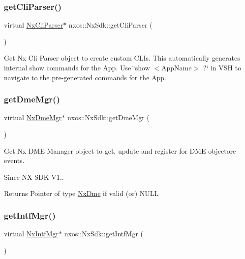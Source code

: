 \subsubsection{\texorpdfstring{get\+Cli\+Parser()}{getCliParser()}}
{\footnotesize\ttfamily virtual \mbox{\hyperlink{classnxos_1_1_nx_cli_parser}{Nx\+Cli\+Parser}}$\ast$ nxos\+::\+Nx\+Sdk\+::get\+Cli\+Parser (\begin{DoxyParamCaption}{ }\end{DoxyParamCaption})\hspace{0.3cm}{\ttfamily [pure virtual]}}

Get Nx Cli Parser object to create custom C\+L\+Is. This automatically generates internal show commands for the App. Use \char`\"{}show $<$\+App\+Name$>$ ?\char`\"{} in V\+SH to navigate to the pre-\/generated commands for the App. \mbox{\label{classnxos_1_1_nx_sdk_a089933980bfe0466870510bb94158763}} 
\subsubsection{\texorpdfstring{get\+Dme\+Mgr()}{getDmeMgr()}}
{\footnotesize\ttfamily virtual \mbox{\hyperlink{classnxos_1_1_nx_dme_mgr}{Nx\+Dme\+Mgr}}$\ast$ nxos\+::\+Nx\+Sdk\+::get\+Dme\+Mgr (\begin{DoxyParamCaption}{ }\end{DoxyParamCaption})\hspace{0.3cm}{\ttfamily [pure virtual]}}

Get Nx D\+ME Manager object to get, update and register for D\+ME objectore events.

\begin{DoxySince}{Since}
N\+X-\/\+S\+DK V1.. 
\end{DoxySince}
\begin{DoxyReturn}{Returns}
Pointer of type \mbox{\hyperlink{classnxos_1_1_nx_dme}{Nx\+Dme}} if valid (or) N\+U\+LL 
\end{DoxyReturn}
\mbox{\label{classnxos_1_1_nx_sdk_ac860ca0ab2bd58d28f990685c63906a0}} 
\subsubsection{\texorpdfstring{get\+Intf\+Mgr()}{getIntfMgr()}}
{\footnotesize\ttfamily virtual \mbox{\hyperlink{classnxos_1_1_nx_intf_mgr}{Nx\+Intf\+Mgr}}$\ast$ nxos\+::\+Nx\+Sdk\+::get\+Intf\+Mgr (\begin{DoxyParamCaption}{ }\end{DoxyParamCaption})\hspace{0.3cm}{\ttfamily [pure virtual]}}

